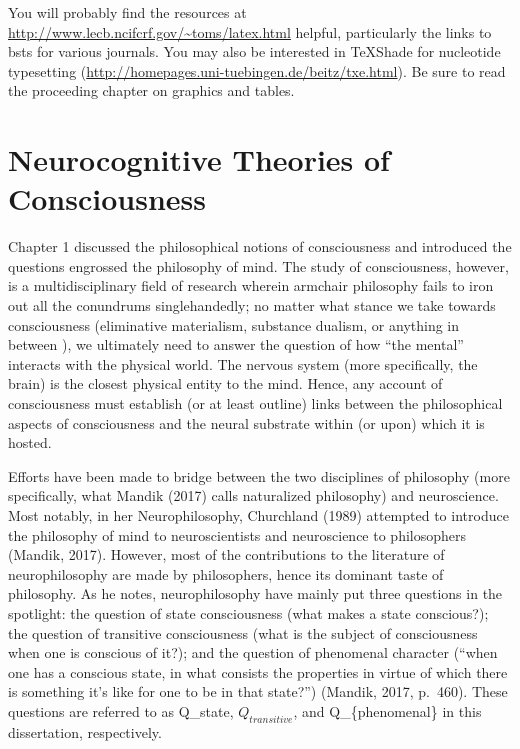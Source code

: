 \documentclass[12pt,twoside]{reedthesis}
\begin{document}
You will probably find the resources at \url{http://www.lecb.ncifcrf.gov/~toms/latex.html} helpful, particularly the links to bsts for various journals. You may also be interested in TeXShade for nucleotide typesetting (\url{http://homepages.uni-tuebingen.de/beitz/txe.html}). Be sure to read the proceeding chapter on graphics and tables.

\hypertarget{ch3}{%
\chapter{Neurocognitive Theories of Consciousness}\label{ch3}}

Chapter 1 discussed the philosophical notions of consciousness and introduced the questions engrossed the philosophy of mind. The study of consciousness, however, is a multidisciplinary field of research wherein armchair philosophy fails to iron out all the conundrums singlehandedly; no matter what stance we take towards consciousness (eliminative materialism, substance dualism, or anything in between ), we ultimately need to answer the question of how ``the mental'' interacts with the physical world. The nervous system (more specifically, the brain) is the closest physical entity to the mind. Hence, any account of consciousness must establish (or at least outline) links between the philosophical aspects of consciousness and the neural substrate within (or upon) which it is hosted.

Efforts have been made to bridge between the two disciplines of philosophy (more specifically, what Mandik (2017) calls naturalized philosophy) and neuroscience. Most notably, in her Neurophilosophy, Churchland (1989) attempted to introduce the philosophy of mind to neuroscientists and neuroscience to philosophers (Mandik, 2017). However, most of the contributions to the literature of neurophilosophy are made by philosophers, hence its dominant taste of philosophy. As he notes, neurophilosophy have mainly put three questions in the spotlight: the question of state consciousness (what makes a state conscious?); the question of transitive consciousness (what is the subject of consciousness when one is conscious of it?); and the question of phenomenal character (``when one has a conscious state, in what consists the properties in virtue of which there is something it's like for one to be in that state?'') (Mandik, 2017, p.~460). These questions are referred to as Q\_state, \(Q_{transitive}\), and Q\_\{phenomenal\} in this dissertation, respectively.
\end{document}
